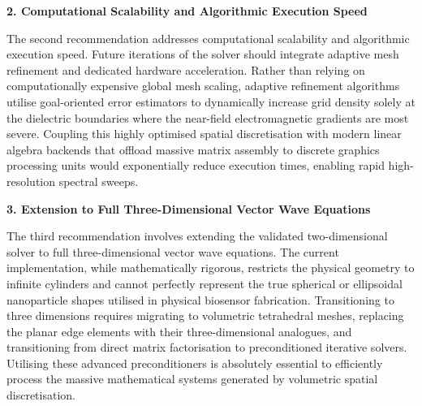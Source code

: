 \documentclass[class=report, crop=false]{standalone}
\begin{document}
\vspace{12pt}

\noindent\textbf{2. Computational Scalability and Algorithmic Execution Speed}

\vspace{6pt}

The second recommendation addresses computational scalability and algorithmic execution speed. Future iterations of the solver should integrate adaptive mesh refinement and dedicated hardware acceleration. Rather than relying on computationally expensive global mesh scaling, adaptive refinement algorithms utilise goal-oriented error estimators to dynamically increase grid density solely at the dielectric boundaries where the near-field electromagnetic gradients are most severe. Coupling this highly optimised spatial discretisation with modern linear algebra backends that offload massive matrix assembly to discrete graphics processing units would exponentially reduce execution times, enabling rapid high-resolution spectral sweeps.

\vspace{12pt}

\noindent\textbf{3. Extension to Full Three-Dimensional Vector Wave Equations}

\vspace{6pt}

The third recommendation involves extending the validated two-dimensional solver to full three-dimensional vector wave equations. The current implementation, while mathematically rigorous, restricts the physical geometry to infinite cylinders and cannot perfectly represent the true spherical or ellipsoidal nanoparticle shapes utilised in physical biosensor fabrication. Transitioning to three dimensions requires migrating to volumetric tetrahedral meshes, replacing the planar edge elements with their three-dimensional analogues, and transitioning from direct matrix factorisation to preconditioned iterative solvers. Utilising these advanced preconditioners is absolutely essential to efficiently process the massive mathematical systems generated by volumetric spatial discretisation.
\end{document}
